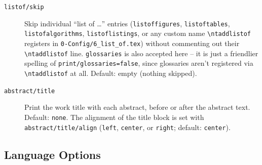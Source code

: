 \begin{description}
  \item[\texttt{listof/skip}] Skip individual ``list of \ldots'' entries
    (\texttt{listoffigures}, \texttt{listoftables}, \texttt{listofalgorithms},
    \texttt{listoflistings}, or any custom name \verb!\ntaddlistof! registers
    in \verb!0-Config/6_list_of.tex!) without commenting out their
    \verb!\ntaddlistof! line. \texttt{glossaries} is also accepted here --
    it is just a friendlier spelling of \texttt{print/glossaries=false},
    since glossaries aren't registered via \verb!\ntaddlistof! at all.
    Default: empty (nothing skipped).
\begin{latexcode}
\end{latexcode}

  \item[\texttt{abstract/title}] Print the work title with each abstract,
    before or after the abstract text.  Default: \texttt{none}.
    The alignment of the title block is set with
    \texttt{abstract/title/align} (\texttt{left}, \texttt{center}, or
    \texttt{right}; default: \texttt{center}).
\begin{latexcode}
\end{latexcode}
\end{description}

\subsection{Language Options}
\label{sub:language_options}

